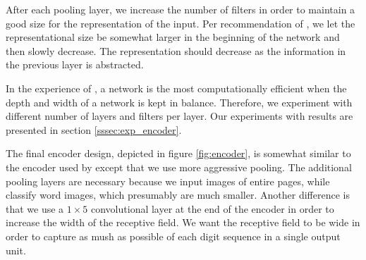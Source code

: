 After each pooling layer, we increase the number of filters in order to maintain a good size for the representation of the input. Per recommendation of \textcite{InceptionV3}, we let the representational size be somewhat larger in the beginning of the network and then slowly decrease. The representation should decrease as the information in the previous layer is abstracted.

In the experience of \textcite{InceptionV3}, a network is the most computationally efficient when the depth and width of a network is kept in balance. Therefore, we experiment with different number of layers and filters per layer. Our experiments with results are presented in section \ref{sssec:exp_encoder}.




The final encoder design, depicted in figure \ref{fig:encoder}, is somewhat similar to the encoder used by \textcite{FornesCnnCategorization} except that we use more aggressive pooling. The additional pooling layers are necessary because we input images of entire pages, while \textcite{FornesCnnCategorization} classify word images, which presumably are much smaller.
Another difference is that we use a $1 \times 5$ convolutional layer at the end of the encoder in order to increase the width of the receptive field. We want the receptive field to be wide in order to capture as mush as possible of each  digit sequence in a single output unit.


